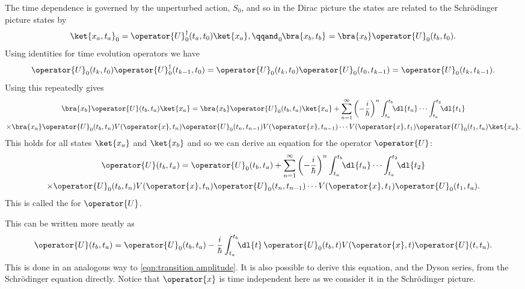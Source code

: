 \documentclass[fleqn]{NotesClass}
\newcommand*{\hermit}{\dagger}
\begin{document}
    The time dependence is governed by the unperturbed action, \(S_0\), and so in the Dirac picture the states are related to the Schr\"odinger picture states by
    \begin{equation}
        \ket{x_a, t_a}_0 = \operator{U}_0^\hermit(t_a, t_0)\ket{x_a}, \qqand \tensor[_0]{\bra{x_b, t_b}}{} = \bra{x_b}\operator{U}_0(t_b, t_0).
    \end{equation}
    Using identities for time evolution operators we have
    \begin{equation}
        \operator{U}_0(t_k, t_0)\operator{U}_0^\hermit(t_{k-1}, t_0) = \operator{U}_0(t_k, t_0)\operator{U}_0(t_0, t_{k-1}) = \operator{U}_0(t_k, t_{k-1}).
    \end{equation}
    Using this repeatedly gives
    \begin{multline}
        \bra{x_b} \operator{U}(t_b, t_a)\ket{x_a} = \bra{x_b} \operator{U}_0(t_b, t_a) \ket{x_a} + \sum_{n=1}^{\infty} \left( -\frac{i}{\hbar} \right)^n \int_{t_a}^{t_b} \!\! \dl{t_n} \dotsm \int_{t_a}^{t_2} \!\! \dl{t_1}\notag\\
        \times \bra{x_a} \operator{U}_0(t_b, t_n) V(\operator{x}, t_n) \operator{U}_0(t_n, t_{n-1}) V(\operator{x}, t_{n-1}) \dotsm V(\operator{x}, t_1)\operator{U}_0(t_1, t_a) \ket{x_a}.
    \end{multline}
    This holds for all states \(\ket{x_a}\) and \(\ket{x_b}\) and so we can derive an equation for the operator \(\operator{U}\):
    \begin{multline}
        \operator{U}(t_b, t_a) = \operator{U}_0(t_b, t_a) + \sum_{n=1}^{\infty} \left( -\frac{i}{\hbar} \right)^{n} \int_{t_a}^{t_b} \!\! \dl{t_n} \dotsm \int_{t_a}^{t_2} \!\! \dl{t_2}\\
        \times\operator{U}_0(t_b, t_n) V(\operator{x}, t_n)\operator{U}_0(t_n, t_{n-1}) \dotsm V(\operator{x}, t_1)\operator{U}_0(t_1, t_a).
    \end{multline}
    This is called the  for \(\operator{U}\).
    
    This can be written more neatly as
    \begin{equation}\label{eqn:perturbed time evoloution operator equation}
        \operator{U}(t_b, t_a) = \operator{U}_0(t_b, t_a) - \frac{i}{\hbar} \int_{t_a}^{t_b} \!\! \dl{t} \, \operator{U}_0(t_b, t) V(\operator{x}, t)\operator{U}(t, t_a).
    \end{equation}
    This is done in an analogous way to \cref{eqn:transition amplitude}.
    It is also possible to derive this equation, and the Dyson series, from the Schr\"odinger equation directly.
    Notice that \(\operator{x}\) is time independent here as we consider it in the Schr\"odinger picture.
    
\end{document}
